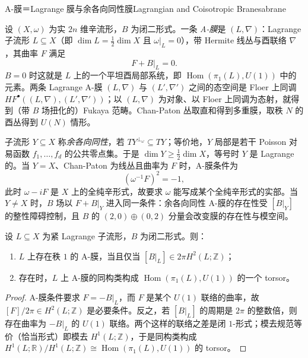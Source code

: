 \begin{centry}{A-膜＝Lagrange 膜与余各向同性膜}{Lagrangian and Coisotropic Branes}{abrane}

\begin{definition}[A-膜]
设 $(X,\omega)$ 为实 $2n$ 维辛流形，$B$ 为闭二形式。一条 \emph{A-膜}是 $(L,\nabla)$：Lagrange 子流形 $L\subseteq X$（即 $\dim L=\frac12\dim X$ 且 $\omega|_L=0$），带 Hermite 线丛与酉联络 $\nabla$，其曲率 $F$ 满足
\[
F+B|_L=0 .
\]
$B=0$ 时这就是 $L$ 上的一个平坦酉局部系统，即 $\operatorname{Hom}(\pi_1(L),U(1))$ 中的元素。两条 Lagrange A-膜 $(L,\nabla)$ 与 $(L',\nabla')$ 之间的态空间是 Floer 上同调 $HF^{\bullet}((L,\nabla),(L',\nabla'))$；以 $(L,\nabla)$ 为对象、以 Floer 上同调为态射，就得到（带 $B$ 场扭化的）Fukaya 范畴。Chan-Paton 丛取直和得到多重膜，取秩 $N$ 的酉丛得到 $U(N)$ 情形。
\end{definition}

\begin{definition}[余各向同性膜]
子流形 $Y\subseteq X$ 称\emph{余各向同性}，若 $TY^{\perp_\omega}\subseteq TY$；等价地，$Y$ 局部是若干 Poisson 对易函数 $f_1,\dots,f_d$ 的公共零点集。于是 $\dim Y\ge\frac12\dim X$，等号时 $Y$ 是 Lagrange 的。当 $Y=X$、Chan-Paton 为线丛且曲率为 $F$ 时，A-膜条件为
\[
(\omega^{-1}F)^2=-1,
\]
此时 $\omega-iF$ 是 $X$ 上的全纯辛形式，故要求 $\omega$ 能写成某个全纯辛形式的实部。当 $Y\neq X$ 时，$B$ 场以 $F+B|_Y$ 进入同一条件：余各向同性 A-膜的存在性受 $[B|_Y]$ 的整性障碍控制，且 $B$ 的 $(2,0)\oplus(0,2)$ 分量会改变膜的存在性与模空间。
\end{definition}

\begin{theorem}
设 $L\subseteq X$ 为紧 Lagrange 子流形，$B$ 为闭二形式。则：
\begin{enumerate}[label=(\roman*)]
\item $L$ 上存在秩 $1$ 的 A-膜，当且仅当 $[B|_L]\in2\pi H^2(L;\mathbb{Z})$；
\item 存在时，$L$ 上 A-膜的同构类构成 $\operatorname{Hom}(\pi_1(L),U(1))$ 的一个 torsor。
\end{enumerate}
\end{theorem}
\begin{proof}
A-膜条件要求 $F=-B|_L$，而 $F$ 是某个 $U(1)$ 联络的曲率，故 $[F]/2\pi\in H^2(L;\mathbb{Z})$ 是必要条件。反之，若 $[B|_L]$ 的周期是 $2\pi$ 的整数倍，则存在曲率为 $-B|_L$ 的 $U(1)$ 联络。两个这样的联络之差是闭 $1$-形式；模去规范等价（恰当形式）即模去 $H^1(L;\mathbb{Z})$，于是同构类构成 $H^1(L;\mathbb{R})/H^1(L;\mathbb{Z})\cong\operatorname{Hom}(\pi_1(L),U(1))$ 的 torsor。
\end{proof}


\end{centry}
